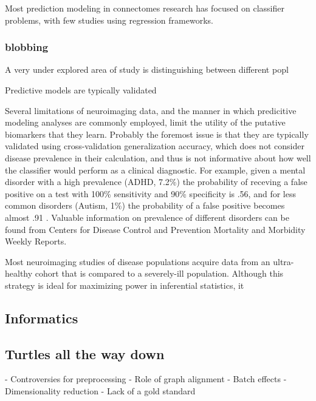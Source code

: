 Most prediction modeling in connectomes research has focused on classifier problems, with few studies using
regression frameworks. 

\subsubsection{blobbing}

A very under explored area of study is distinguishing between different popl

Predictive models are 
typically validated 


Several limitations of neuroimaging data, and the manner in which predicitive modeling analyses are 
commonly employed, limit the utility of the putative biomarkers that they learn. Probably the foremost
issue is that they are typically validated using cross-validation generalization accuracy, which does not
consider disease prevalence in their calculation, and thus is not informative about how well the classifier
would perform as a clinical diagnostic. For example, given a mental disorder with a high prevalence
(ADHD, 7.2\%) the probability of receving a false positive on a test with 100\% sensitivity and 90\% specificity
is .56, and for less common disorders (Autism, 1\%) the probability of a false positive becomes almost .91 \cite{grimes,altmanbland}.
Valuable information on prevalence of different disorders can be found from Centers for Disease Control and Prevention Mortality
and Morbidity Weekly Reports.  

Most neuroimaging studies of disease populations acquire data from an ultra-healthy cohort that is compared to
a severely-ill population. Although this strategy is ideal for maximizing power in inferential statistics, it 





\subsection{Informatics}

\subsection{Turtles all the way down}

- Controversies for preprocessing
- Role of graph alignment
- Batch effects
- Dimensionality reduction
- Lack of a gold standard


